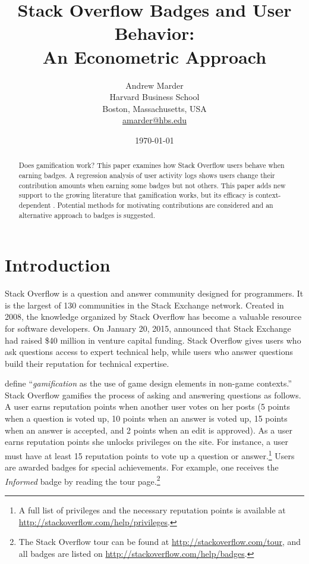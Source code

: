 \documentclass[conference]{IEEEtran}
\title{
  Stack Overflow Badges and User Behavior: \\
  An Econometric Approach
}
\author{
  Andrew Marder \\
  Harvard Business School \\
  Boston, Massachusetts, USA \\
  \href{mailto:amarder@hbs.edu}{amarder@hbs.edu}
}
\date{\today}
\newcommand{\1}{\mathds{1}}
\begin{document}
\maketitle

\begin{abstract}
Does gamification work? This paper examines how Stack Overflow users behave when earning badges. A regression analysis of user activity logs shows users change their contribution amounts when earning some badges but not others. This paper adds new support to the growing literature that gamification works, but its efficacy is context-dependent \citep{Hamari}. Potential methods for motivating contributions are considered and an alternative approach to badges is suggested.
\end{abstract}

\section{Introduction}

Stack Overflow is a question and answer community designed for programmers. It is the largest of 130 communities in the Stack Exchange network. Created in 2008, the knowledge organized by Stack Overflow has become a valuable resource for software developers. On January 20, 2015, \citet{Spoelsky2015} announced that Stack Exchange had raised \$40 million in venture capital funding. Stack Overflow gives users who ask questions access to expert technical help, while users who answer questions build their reputation for technical expertise.

\citet{Deterding2011} define ``\textit{gamification} as the use of game design elements in non-game contexts.'' Stack Overflow gamifies the process of asking and answering questions as follows. A user earns reputation points when another user votes on her posts (5 points when a question is voted up, 10 points when an answer is voted up, 15 points when an answer is accepted, and 2 points when an edit is approved). As a user earns reputation points she unlocks privileges on the site. For instance, a user must have at least 15 reputation points to vote up a question or answer.\footnote{A full list of privileges and the necessary reputation points is available at \url{http://stackoverflow.com/help/privileges}.} Users are awarded badges for special achievements. For example, one receives the \textit{Informed} badge by reading the tour page.\footnote{The Stack Overflow tour can be found at \url{http://stackoverflow.com/tour}, and all badges are listed on \url{http://stackoverflow.com/help/badges}.}
\end{document}
